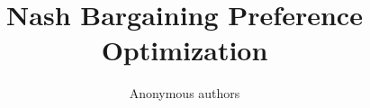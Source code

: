 \documentclass{article}
\title{Nash Bargaining Preference Optimization}
\author{Anonymous authors}
\theoremstyle{remark}
\theoremstyle{plain}
\begin{document}
\maketitle

\newcommand{\tabonecommon}{1{,}236}
\newcommand{\tabonevalidrange}{$1{,}884$--$1{,}941$}
\newcommand{\tabonearms}{25}
\newcommand{\tabonearmsnum}{25}
\newcommand{\tabonematchedminlist}{$0.4955$, $0.5002$, $0.4980$ and $0.4944$}
\newcommand{\tabonematchedminspread}{$0.0058$}
\newcommand{\tabonematchedminrange}{$0.4944$--$0.5002$}
\newcommand{\tabonematchedbelowhalf}{three}
\newcommand{\tabonematchedagreeall}{$0.0059$}
\newcommand{\tabonematchedagreeif}{$0.0048$}
\newcommand{\tabonematchedagreehelp}{$0.0030$}
\newcommand{\tabonemechif}{$0.5056$--$0.5130$}
\newcommand{\tabonemechtruth}{$0.5076$--$0.5136$}
\newcommand{\tabonemechhonesty}{$0.4944$--$0.5032$}
\newcommand{\tabonemechhelp}{$0.5466$--$0.5508$}
\newcommand{\tabonemechmin}{$0.4944$--$0.5021$}
\newcommand{\tabonedposeeds}{three}
\newcommand{\tabonedposeedphrase}{three seeds}
\newcommand{\tabonedpoif}{$0.5653$}
\newcommand{\tabonedpotruth}{$0.5647$}
\newcommand{\tabonedpohonesty}{$0.5044$}
\newcommand{\tabonedpohelp}{$0.6282$}
\newcommand{\tabonedpomin}{$0.5044$}
\newcommand{\tabonedpomaxsd}{$0.0065$}
\newcommand{\tabonedpoexcl}{instruction following, truthfulness and helpfulness}
\newcommand{\tabonedpoabove}{instruction following, truthfulness, honesty and helpfulness}
\newcommand{\tabonedpobelow}{no attribute}
\newcommand{\tabonedpominplace}{above all five of them}
\newcommand{\tabonemoposeeds}{three}
\newcommand{\tabonemoposeedphrase}{three seeds}
\newcommand{\tabonemopoif}{$0.5205$}
\newcommand{\tabonemopotruth}{$0.5171$}
\newcommand{\tabonemopohonesty}{$0.5028$}
\newcommand{\tabonemopohelp}{$0.5278$}
\newcommand{\tabonemopomin}{$0.5028$}
\newcommand{\tabonemopomaxsd}{$0.0117$}
\newcommand{\tabonemopoexcl}{instruction following and helpfulness}
\newcommand{\tabonemopoabove}{instruction following and truthfulness}
\newcommand{\tabonemopobelow}{helpfulness}
\newcommand{\tabonemopominplace}{above all five of them}
\newcommand{\taboneprosperseeds}{two}
\newcommand{\taboneprosperseedphrase}{two seeds}
\newcommand{\taboneprosperif}{$0.5109$}
\newcommand{\taboneprospertruth}{$0.5095$}
\newcommand{\taboneprosperhonesty}{$0.5031$}
\newcommand{\taboneprosperhelp}{$0.5452$}
\end{document}
